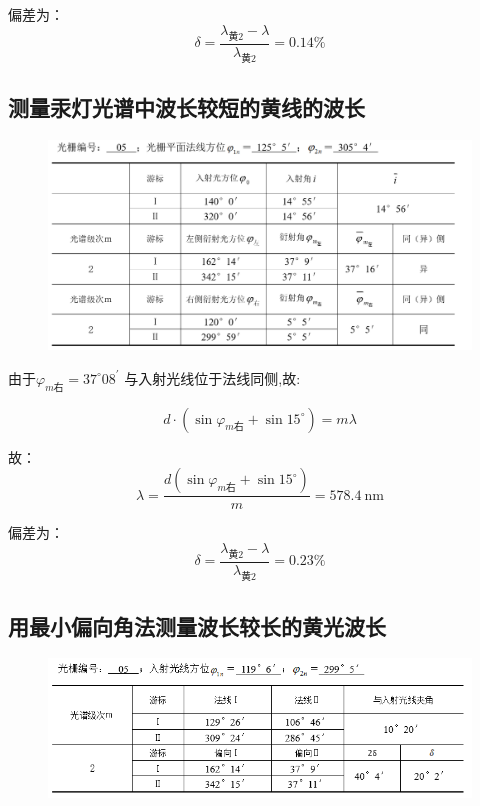 \documentclass[UTF8]{ctexart}
\begin{document}
   偏差为：
   $$
   \delta = \frac{\lambda_{\mbox{黄2}}-\lambda}{\lambda_{\mbox{黄2}}}=0.14\%
   $$

\subsection{测量汞灯光谱中波长较短的黄线的波长}

\begin{figure}[H]
  \centering
  \includegraphics[scale=0.7]{表格2.png}
\end{figure}

由于$\varphi_{m \text{右}}=37^{\circ} 08^{\prime}$  与入射光线位于法线同侧,故:

$$
d\cdot \left(\sin \varphi_{m \text{右}}+\sin 15^{\circ}\right)=m \lambda
$$

故：
$$
\lambda=\frac{d (\sin \varphi_{m \text{右}}+\sin 15^{\circ})}{m}=578.4 \mathrm{~nm}
$$

偏差为：
$$
\delta = \frac{\lambda_{\mbox{黄2}}-\lambda}{\lambda_{\mbox{黄2}}}=0.23\%
$$

\subsection{用最小偏向角法测量波长较长的黄光波长}

\begin{figure}[H]
  \centering
  \includegraphics[scale=1.2]{表格3.png}
\end{figure}
\end{document}
